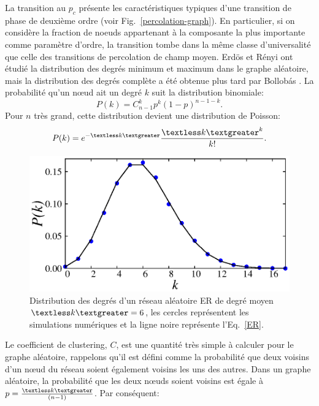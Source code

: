La transition au $p_c$ présente les caractéristiques typiques d'une transition de phase de deuxième ordre (voir Fig.~\ref{percolation-graph}). En particulier, si on considère la fraction de noeuds appartenant à la composante la plus importante comme paramètre d'ordre, la transition tombe dans la même classe d'universalité que celle des transitions de percolation de champ moyen. Erdös et Rényi ont étudié la distribution des degrés minimum et maximum dans le graphe aléatoire, mais la distribution des degrés complète a été obtenue plus tard par Bollobás \cite{Bollobas1998}. La probabilité qu'un nœud ait un degré $k$ suit la distribution binomiale:
\begin{equation}
P(k)=C^k_{n-1}p^k(1-p)^{n-1-k}.
\end{equation}
Pour $n$ très grand,  cette distribution devient une distribution de Poisson:
\begin{equation}
P(k)=e^{-\textless k\textgreater}\dfrac{\textless k\textgreater^k}{k!}.
\label{ER}
\end{equation}
\begin{figure}[h!]
	\centering
	\includegraphics[scale=1]{./figures/fig-ER-dist}
	\caption{Distribution des degrés d'un réseau aléatoire ER de degré moyen $\km=6$, les cercles représentent les simulations numériques et la ligne noire représente l'Eq.~\eqref{ER}.}
	
	\label{ER-distribution}
\end{figure} 

Le coefficient de clustering, $C$, est une quantité très simple à calculer pour le graphe aléatoire, rappelons qu'il est défini comme la probabilité que deux voisins d'un nœud du réseau soient également voisins les uns des autres. Dans un graphe aléatoire, la probabilité que les deux nœuds soient voisins est égale à $p=\frac{\textless k\textgreater}{(n - 1)}$. Par conséquent:

